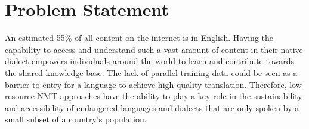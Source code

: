 %
%
%
%
%


\section{Problem Statement}
An estimated 55\% of all content on the internet is in English. Having the capability to access and understand such a vast amount of content in their native dialect empowers individuals around the world to learn and contribute towards the shared knowledge base. The lack of parallel training data could be seen as a barrier to entry for a language to achieve high quality translation. Therefore, low-resource NMT approaches have the ability to play a key role in the sustainability and accessibility of endangered languages and dialects that are only spoken by a small subset of a country's population. 

